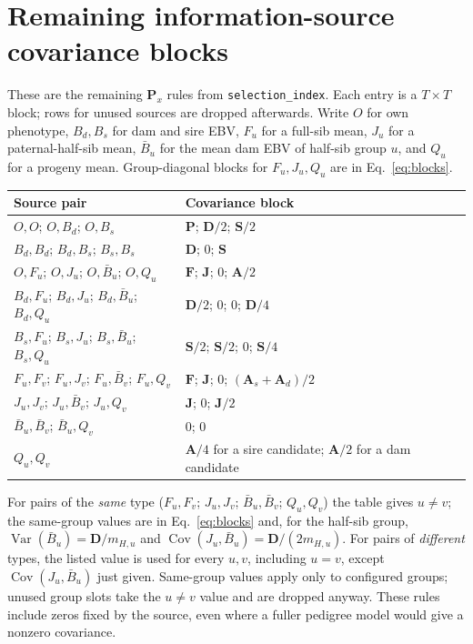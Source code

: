 \documentclass[11pt]{article}
\newcommand{\src}[1]{\texttt{#1}}
\newcommand{\Cov}{\operatorname{Cov}}
\newcommand{\Var}{\operatorname{Var}}
\newcommand{\ma}[1]{\mathbf{#1}}
\begin{document}
\appendix
\section{Remaining information-source covariance blocks}\label{app:sourceblocks}
These are the remaining $\ma P_x$ rules from \src{selection\_index}. Each entry is a $T\times T$ block; rows for unused sources are dropped afterwards. Write $O$ for own phenotype, $B_d,B_s$ for dam and sire EBV, $F_u$ for a full-sib mean, $J_u$ for a paternal-half-sib mean, $\bar B_u$ for the mean dam EBV of half-sib group $u$, and $Q_u$ for a progeny mean. Group-diagonal blocks for $F_u,J_u,Q_u$ are in Eq.~\eqref{eq:blocks}.
\begin{center}
\begin{tabular}{p{.30\linewidth}p{.55\linewidth}}\toprule
Source pair & Covariance block\\\midrule
$O,O$; $O,B_d$; $O,B_s$ & $\ma P$; $\ma D/2$; $\ma S/2$\\
$B_d,B_d$; $B_d,B_s$; $B_s,B_s$ & $\ma D$; $0$; $\ma S$\\
$O,F_u$; $O,J_u$; $O,\bar B_u$; $O,Q_u$ & $\ma F$; $\ma J$; $0$; $\ma A/2$\\
$B_d,F_u$; $B_d,J_u$; $B_d,\bar B_u$; $B_d,Q_u$ & $\ma D/2$; $0$; $0$; $\ma D/4$\\
$B_s,F_u$; $B_s,J_u$; $B_s,\bar B_u$; $B_s,Q_u$ & $\ma S/2$; $\ma S/2$; $0$; $\ma S/4$\\
$F_u,F_v$; $F_u,J_v$; $F_u,\bar B_v$; $F_u,Q_v$ & $\ma F$; $\ma J$; $0$; $(\ma A_s+\ma A_d)/2$\\
$J_u,J_v$; $J_u,\bar B_v$; $J_u,Q_v$ & $\ma J$; $0$; $\ma J/2$\\
$\bar B_u,\bar B_v$; $\bar B_u,Q_v$ & $0$; $0$\\
$Q_u,Q_v$ & $\ma A/4$ for a sire candidate; $\ma A/2$ for a dam candidate\\\bottomrule
\end{tabular}
\end{center}
For pairs of the \emph{same} type ($F_u,F_v$; $J_u,J_v$; $\bar B_u,\bar B_v$; $Q_u,Q_v$) the table gives $u\ne v$; the same-group values are in Eq.~\eqref{eq:blocks} and, for the half-sib group, $\Var(\bar B_u)=\ma D/m_{H,u}$ and $\Cov(J_u,\bar B_u)=\ma D/(2m_{H,u})$. For pairs of \emph{different} types, the listed value is used for every $u,v$, including $u=v$, except $\Cov(J_u,\bar B_u)$ just given. Same-group values apply only to configured groups; unused group slots take the $u\ne v$ value and are dropped anyway. These rules include zeros fixed by the source, even where a fuller pedigree model would give a nonzero covariance.
\end{document}
